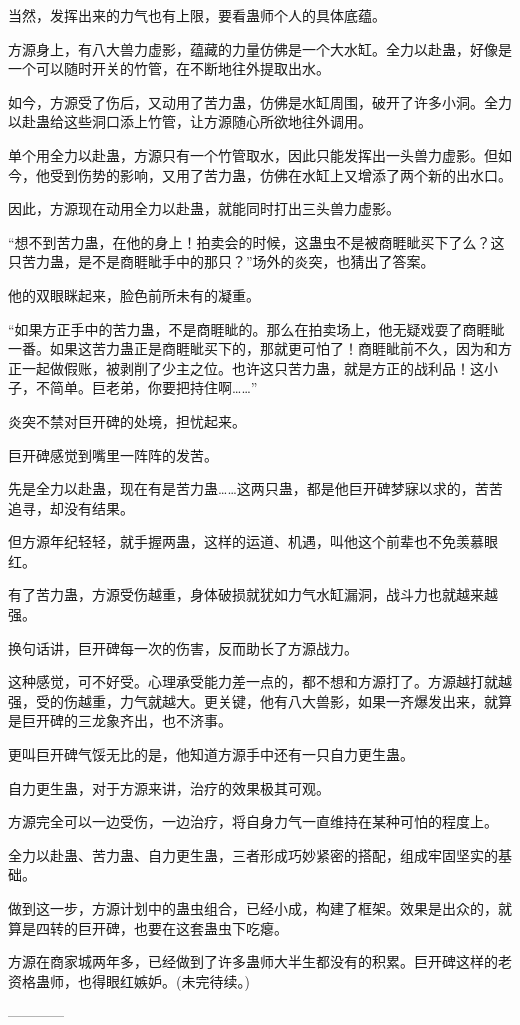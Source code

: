 \begin{this_body}
当然，发挥出来的力气也有上限，要看蛊师个人的具体底蕴。

方源身上，有八大兽力虚影，蕴藏的力量仿佛是一个大水缸。全力以赴蛊，好像是一个可以随时开关的竹管，在不断地往外提取出水。

如今，方源受了伤后，又动用了苦力蛊，仿佛是水缸周围，破开了许多小洞。全力以赴蛊给这些洞口添上竹管，让方源随心所欲地往外调用。

单个用全力以赴蛊，方源只有一个竹管取水，因此只能发挥出一头兽力虚影。但如今，他受到伤势的影响，又用了苦力蛊，仿佛在水缸上又增添了两个新的出水口。

因此，方源现在动用全力以赴蛊，就能同时打出三头兽力虚影。

“想不到苦力蛊，在他的身上！拍卖会的时候，这蛊虫不是被商睚眦买下了么？这只苦力蛊，是不是商睚眦手中的那只？”场外的炎突，也猜出了答案。

他的双眼眯起来，脸色前所未有的凝重。

“如果方正手中的苦力蛊，不是商睚眦的。那么在拍卖场上，他无疑戏耍了商睚眦一番。如果这苦力蛊正是商睚眦买下的，那就更可怕了！商睚眦前不久，因为和方正一起做假账，被剥削了少主之位。也许这只苦力蛊，就是方正的战利品！这小子，不简单。巨老弟，你要把持住啊……”

炎突不禁对巨开碑的处境，担忧起来。

巨开碑感觉到嘴里一阵阵的发苦。

先是全力以赴蛊，现在有是苦力蛊……这两只蛊，都是他巨开碑梦寐以求的，苦苦追寻，却没有结果。

但方源年纪轻轻，就手握两蛊，这样的运道、机遇，叫他这个前辈也不免羡慕眼红。

有了苦力蛊，方源受伤越重，身体破损就犹如力气水缸漏洞，战斗力也就越来越强。

换句话讲，巨开碑每一次的伤害，反而助长了方源战力。

这种感觉，可不好受。心理承受能力差一点的，都不想和方源打了。方源越打就越强，受的伤越重，力气就越大。更关键，他有八大兽影，如果一齐爆发出来，就算是巨开碑的三龙象齐出，也不济事。

更叫巨开碑气馁无比的是，他知道方源手中还有一只自力更生蛊。

自力更生蛊，对于方源来讲，治疗的效果极其可观。

方源完全可以一边受伤，一边治疗，将自身力气一直维持在某种可怕的程度上。

全力以赴蛊、苦力蛊、自力更生蛊，三者形成巧妙紧密的搭配，组成牢固坚实的基础。

做到这一步，方源计划中的蛊虫组合，已经小成，构建了框架。效果是出众的，就算是四转的巨开碑，也要在这套蛊虫下吃瘪。

方源在商家城两年多，已经做到了许多蛊师大半生都没有的积累。巨开碑这样的老资格蛊师，也得眼红嫉妒。(未完待续。)

------------

\end{this_body}


